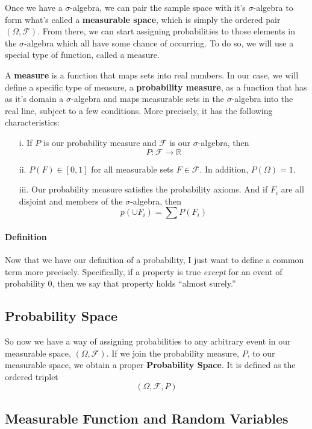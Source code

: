 \documentclass[12pt]{article}
\theoremstyle{plain}
\theoremstyle{definition}
\theoremstyle{remark}
\begin{document}
Once we have a $\sigma$-algebra, we can pair the sample space with it's
$\sigma$-algebra to form what's called a
\textbf{measurable space}, which is simply the ordered pair
$(\Omega, \mathcal{F})$.  From there, we can start assigning
probabilities to those elements in the $\sigma$-algebra which all have
some chance of occurring.  To do so, we will use a special
type of function, called a measure.

A \textbf{measure} is a function that maps sets into real numbers.
In our case, we will define a specific type of measure, a
\textbf{probability measure}, as a
function that has as it's domain a $\sigma$-algebra and maps measurable
sets in the $\sigma$-algebra into the
real line, subject to a few conditions. More precisely, it has the
following characteristics:
\begin{itemize}
   \item[i.] If $P$ is our probability measure and $\mathcal{F}$ is
      our $\sigma$-algebra, then
	 \[ P: \mathcal{F} \rightarrow \mathbb{R} \]
   \item[ii.] $ P(F) \in [0,1]$ for all measurable sets
      $F \in \mathcal{F}$. In addition, $P(\Omega) =1$.
   \item[iii.] Our probability measure satisfies the probability axioms.
      And if $F_i$ are all disjoint and members of the $\sigma$-algebra,
      then
	 \[ p( \cup F_i) = \sum P(F_i) \]
\end{itemize}

\paragraph{Definition} Now that we have our definition of a probability,
I just want to define a common term more precisely.  Specifically,
if a property is true \emph{except} for an event of probability 0,
then we say that property holds ``almost surely.''

\subsection{Probability Space}

So now we have a way of assigning probabilities to any arbitrary event in our measurable space, $(\Omega, \mathcal{F})$. If we
join the probability measure, $P$, to our measurable space, we obtain a proper \textbf{Probability Space}.  It is defined as
the ordered triplet
\[(\Omega, \mathcal{F}, P) \]

\subsection{Measurable Function and Random Variables}
\end{document}
